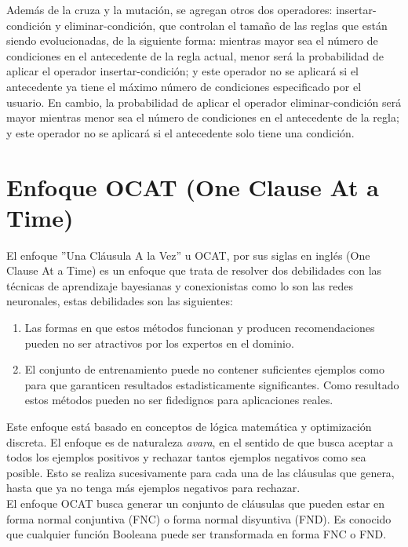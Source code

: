 Además de la cruza y la mutación, se agregan otros dos operadores: insertar-condición y eliminar-condición, que controlan el tamaño de las reglas que están siendo evolucionadas, de la siguiente forma: mientras mayor sea el número de condiciones en el antecedente de la regla actual, menor será la probabilidad de aplicar el operador insertar-condición; y este operador no se aplicará si el antecedente ya tiene el máximo número de condiciones especificado por el usuario. En cambio, la probabilidad de aplicar el operador eliminar-condición será mayor mientras menor sea el número de condiciones en el antecedente de la regla; y este operador no se aplicará si el antecedente solo tiene una condición.

\section{Enfoque OCAT (One Clause At a Time)}

El enfoque ''Una Cláusula A la Vez'' u OCAT, por sus siglas en inglés (One Clause At a Time) es un enfoque que trata de resolver dos debilidades con las técnicas de aprendizaje bayesianas y conexionistas como lo son las redes neuronales, estas debilidades son las siguientes:

\begin{enumerate}
	\item Las formas en que estos métodos funcionan y producen recomendaciones pueden no ser atractivos por los expertos en el dominio. 
	\item El conjunto de entrenamiento puede no contener suficientes ejemplos como para que garanticen resultados estadisticamente significantes. Como resultado estos métodos pueden no ser fidedignos para aplicaciones reales. 
\end{enumerate}

Este enfoque está basado en conceptos de lógica matemática y optimización discreta. El enfoque es de naturaleza \emph{avara}, en el sentido de que busca aceptar a todos los ejemplos positivos y rechazar tantos ejemplos negativos como sea posible. Esto se realiza sucesivamente para cada una de las cláusulas que genera, hasta que ya no tenga más ejemplos negativos para rechazar.
\\

El enfoque OCAT busca generar un conjunto de cláusulas que pueden estar en forma normal conjuntiva (FNC) o forma normal disyuntiva (FND). Es conocido \citep{peysakh1987fast} que cualquier función Booleana puede ser transformada en forma FNC o FND. 
\\

